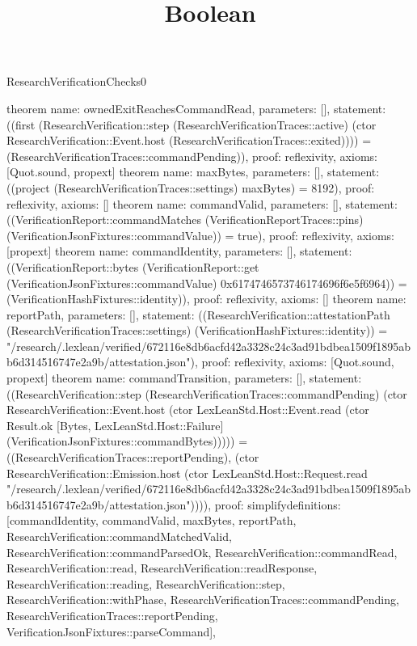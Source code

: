 \begin{lexlean}{ResearchVerificationChecks0}
\title{Boolean}
\begin{semanticmodule}
theorem{
  name: ownedExitReachesCommandRead,
  parameters: [],
  statement: ((first (ResearchVerification::step (ResearchVerificationTraces::active) (ctor ResearchVerification::Event.host (ResearchVerificationTraces::exited)))) = (ResearchVerificationTraces::commandPending)),
  proof: reflexivity{},
  axioms: [Quot.sound, propext]
}
theorem{
  name: maxBytes,
  parameters: [],
  statement: ((project (ResearchVerificationTraces::settings) maxBytes) = 8192),
  proof: reflexivity{},
  axioms: []
}
theorem{
  name: commandValid,
  parameters: [],
  statement: ((VerificationReport::commandMatches (VerificationReportTraces::pins) (VerificationJsonFixtures::commandValue)) = true),
  proof: reflexivity{},
  axioms: [propext]
}
theorem{
  name: commandIdentity,
  parameters: [],
  statement: ((VerificationReport::bytes (VerificationReport::get (VerificationJsonFixtures::commandValue) 0x6174746573746174696f6e5f6964)) = (VerificationHashFixtures::identity)),
  proof: reflexivity{},
  axioms: []
}
theorem{
  name: reportPath,
  parameters: [],
  statement: ((ResearchVerification::attestationPath (ResearchVerificationTraces::settings) (VerificationHashFixtures::identity)) = "/research/.lexlean/verified/672116e8db6acfd42a3328c24c3ad91bdbea1509f1895abb6d314516747e2a9b/attestation.json"),
  proof: reflexivity{},
  axioms: [Quot.sound, propext]
}
theorem{
  name: commandTransition,
  parameters: [],
  statement: ((ResearchVerification::step (ResearchVerificationTraces::commandPending) (ctor ResearchVerification::Event.host (ctor LexLeanStd.Host::Event.read (ctor Result.ok [Bytes, LexLeanStd.Host::Failure] (VerificationJsonFixtures::commandBytes))))) = ((ResearchVerificationTraces::reportPending), (ctor ResearchVerification::Emission.host (ctor LexLeanStd.Host::Request.read "/research/.lexlean/verified/672116e8db6acfd42a3328c24c3ad91bdbea1509f1895abb6d314516747e2a9b/attestation.json")))),
  proof: simplify{definitions: [commandIdentity, commandValid, maxBytes, reportPath, ResearchVerification::commandMatchedValid, ResearchVerification::commandParsedOk, ResearchVerification::commandRead, ResearchVerification::read, ResearchVerification::readResponse, ResearchVerification::reading, ResearchVerification::step, ResearchVerification::withPhase, ResearchVerificationTraces::commandPending, ResearchVerificationTraces::reportPending, VerificationJsonFixtures::parseCommand]},
}
\end{semanticmodule}
\end{lexlean}
